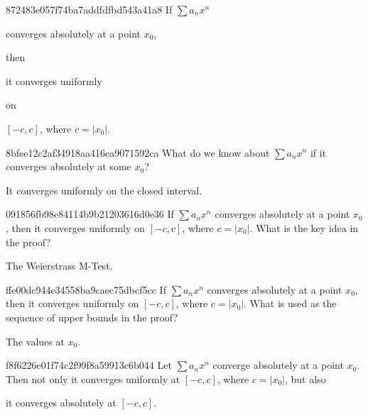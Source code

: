\begin{note}{872483e057f74ba7addfdfbd543a41a8}
    If \({ \sum a_n x^{n} }\) \begin{icloze}{2}converges absolutely at a point \({ x_0 }\),\end{icloze} then \begin{icloze}{1}it converges uniformly\end{icloze} on \begin{icloze}{3}\({ [-c, c] }\), where \({ c = \left\lvert x_0 \right\rvert }\).\end{icloze}
\end{note}

\begin{note}{8bfee12c2af34918aa416ea9071592ca}
    What do we know about \({ \sum a_n x^{n} }\) if it converges absolutely at some \({ x_0 }\)?

    \begin{cloze}{1}
        It converges uniformly on the closed interval.
    \end{cloze}
\end{note}

\begin{note}{091856fb98e84114b9b21203616d0e36}
    If \({ \sum a_n x^{n} }\) converges absolutely at a point \({ x_0 }\), then it converges uniformly on \({ [-c, c] }\), where \({ c = \left\lvert x_0 \right\rvert }\).
    What is the key idea in the proof?

    \begin{cloze}{1}
        The Weierstrass M-Test.
    \end{cloze}
\end{note}

\begin{note}{ffe00dc944e34558ba9caec75dbcf5cc}
    If \({ \sum a_n x^{n} }\) converges absolutely at a point \({ x_0 }\), then it converges uniformly on \({ [-c, c] }\), where \({ c = \left\lvert x_0 \right\rvert }\).
    What is used as the sequence of upper bounds in the proof?

    \begin{cloze}{1}
        The values at \({ x_0 }\).
    \end{cloze}
\end{note}

\begin{note}{f8f6226e01f74c2f99f8a59913c6b044}
    Let \({ \sum a_n x^{n} }\) converge absolutely at a point \({ x_0 }\).
    Then not only it converges uniformly at \({ [-c, c] }\), where \({ c = \left\lvert x_0 \right\rvert }\), but also \begin{icloze}{1}it converges absolutely at \({ [-c, c] }\).\end{icloze}
\end{note}

